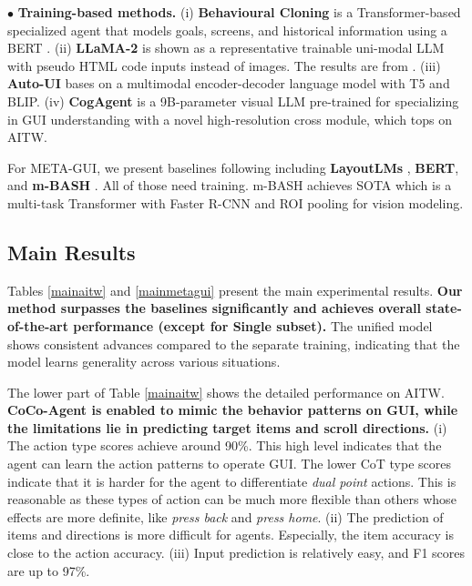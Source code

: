 $\bullet$ \textbf{Training-based methods.} 
(i) \textbf{Behavioural Cloning} \cite{rawles2023android} is a Transformer-based specialized agent that models goals, screens, and historical information using a BERT \cite{devlin-etal-2019-bert}. 
(ii) \textbf{LLaMA-2} is shown as a representative trainable uni-modal LLM with pseudo HTML code inputs instead of images. The results are from \citet{zhang2023you}.
(iii) \textbf{Auto-UI} \cite{zhang2023you} bases on a multimodal encoder-decoder language model with T5 and BLIP. 
(iv) \textbf{CogAgent} \cite{hong2023cogagent} is a 9B-parameter visual LLM pre-trained for specializing in GUI understanding with a novel high-resolution cross module, which tops on AITW.

For META-GUI, we present baselines following \citet{sun2022meta} including \textbf{LayoutLMs} \cite{xu2020layoutlm, xu-etal-2021-layoutlmv2}, \textbf{BERT}, and \textbf{m-BASH} \cite{sun2022meta}. All of those need training.
m-BASH achieves SOTA which is a multi-task Transformer with Faster R-CNN \cite{ren2015faster} and ROI pooling for vision modeling.

\subsection{Main Results}
Tables \ref{mainaitw} and \ref{mainmetagui} present the main experimental results. 
\textbf{Our method surpasses the baselines significantly and achieves overall state-of-the-art performance (except for Single subset).} The unified model shows consistent advances compared to the separate training, indicating that the model learns generality across various situations.

The lower part of Table \ref{mainaitw} shows the detailed performance on AITW.
\textbf{CoCo-Agent is enabled to mimic the behavior patterns on GUI, while the limitations lie in predicting target items and scroll directions.}
(i) The action type scores achieve around 90\%. This high level indicates that the agent can learn the action patterns to operate GUI. The lower CoT type scores indicate that it is harder for the agent to differentiate \textit{dual point} actions. This is reasonable as these types of action can be much more flexible than others whose effects are more definite, like \textit{press back} and \textit{press home}.
(ii) The prediction of items and directions is more difficult for agents. Especially, the item accuracy is close to the action accuracy. 
(iii) Input prediction is relatively easy, and F1 scores are up to 97\%.

